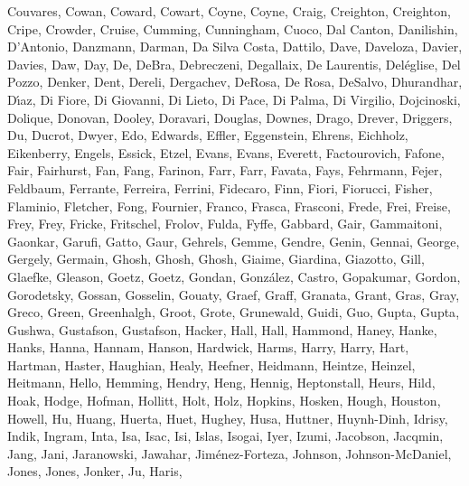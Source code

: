 \documentclass[times,tight]{aastex631}
\begin{document}
\begin{thebibliography}{}
{  {Couvares}, {Cowan}, {Coward}, {Cowart}, {Coyne}, {Coyne}, {Craig},
  {Creighton}, {Creighton}, {Cripe}, {Crowder}, {Cruise}, {Cumming},
  {Cunningham}, {Cuoco}, {Dal Canton}, {Danilishin}, {D'Antonio}, {Danzmann},
  {Darman}, {Da Silva Costa}, {Dattilo}, {Dave}, {Daveloza}, {Davier},
  {Davies}, {Daw}, {Day}, {De}, {DeBra}, {Debreczeni}, {Degallaix}, {De
  Laurentis}, {Del{\'e}glise}, {Del Pozzo}, {Denker}, {Dent}, {Dereli},
  {Dergachev}, {DeRosa}, {De Rosa}, {DeSalvo}, {Dhurandhar}, {D{\'\i}az}, {Di
  Fiore}, {Di Giovanni}, {Di Lieto}, {Di Pace}, {Di Palma}, {Di Virgilio},
  {Dojcinoski}, {Dolique}, {Donovan}, {Dooley}, {Doravari}, {Douglas},
  {Downes}, {Drago}, {Drever}, {Driggers}, {Du}, {Ducrot}, {Dwyer}, {Edo},
  {Edwards}, {Effler}, {Eggenstein}, {Ehrens}, {Eichholz}, {Eikenberry},
  {Engels}, {Essick}, {Etzel}, {Evans}, {Evans}, {Everett}, {Factourovich},
  {Fafone}, {Fair}, {Fairhurst}, {Fan}, {Fang}, {Farinon}, {Farr}, {Farr},
  {Favata}, {Fays}, {Fehrmann}, {Fejer}, {Feldbaum}, {Ferrante}, {Ferreira},
  {Ferrini}, {Fidecaro}, {Finn}, {Fiori}, {Fiorucci}, {Fisher}, {Flaminio},
  {Fletcher}, {Fong}, {Fournier}, {Franco}, {Frasca}, {Frasconi}, {Frede},
  {Frei}, {Freise}, {Frey}, {Frey}, {Fricke}, {Fritschel}, {Frolov}, {Fulda},
  {Fyffe}, {Gabbard}, {Gair}, {Gammaitoni}, {Gaonkar}, {Garufi}, {Gatto},
  {Gaur}, {Gehrels}, {Gemme}, {Gendre}, {Genin}, {Gennai}, {George}, {Gergely},
  {Germain}, {Ghosh}, {Ghosh}, {Ghosh}, {Giaime}, {Giardina}, {Giazotto},
  {Gill}, {Glaefke}, {Gleason}, {Goetz}, {Goetz}, {Gondan}, {Gonz{\'a}lez},
  {Castro}, {Gopakumar}, {Gordon}, {Gorodetsky}, {Gossan}, {Gosselin},
  {Gouaty}, {Graef}, {Graff}, {Granata}, {Grant}, {Gras}, {Gray}, {Greco},
  {Green}, {Greenhalgh}, {Groot}, {Grote}, {Grunewald}, {Guidi}, {Guo},
  {Gupta}, {Gupta}, {Gushwa}, {Gustafson}, {Gustafson}, {Hacker}, {Hall},
  {Hall}, {Hammond}, {Haney}, {Hanke}, {Hanks}, {Hanna}, {Hannam}, {Hanson},
  {Hardwick}, {Harms}, {Harry}, {Harry}, {Hart}, {Hartman}, {Haster},
  {Haughian}, {Healy}, {Heefner}, {Heidmann}, {Heintze}, {Heinzel}, {Heitmann},
  {Hello}, {Hemming}, {Hendry}, {Heng}, {Hennig}, {Heptonstall}, {Heurs},
  {Hild}, {Hoak}, {Hodge}, {Hofman}, {Hollitt}, {Holt}, {Holz}, {Hopkins},
  {Hosken}, {Hough}, {Houston}, {Howell}, {Hu}, {Huang}, {Huerta}, {Huet},
  {Hughey}, {Husa}, {Huttner}, {Huynh-Dinh}, {Idrisy}, {Indik}, {Ingram},
  {Inta}, {Isa}, {Isac}, {Isi}, {Islas}, {Isogai}, {Iyer}, {Izumi}, {Jacobson},
  {Jacqmin}, {Jang}, {Jani}, {Jaranowski}, {Jawahar}, {Jim{\'e}nez-Forteza},
  {Johnson}, {Johnson-McDaniel}, {Jones}, {Jones}, {Jonker}, {Ju}, {Haris},
}
\end{thebibliography}
\end{document}
